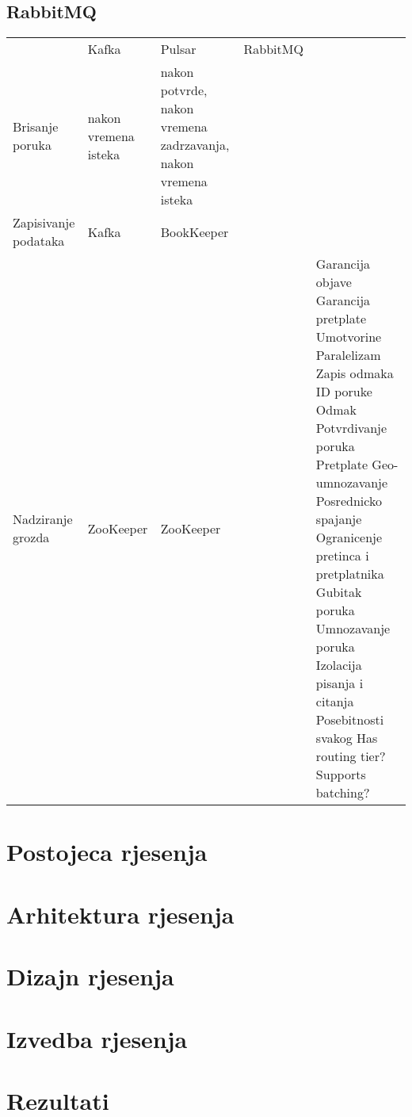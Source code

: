 \documentclass[times, utf8, diplomski, numeric]{fer}
\begin{document}
\section{RabbitMQ}



\begin{table}[]
\begin{tabular}{lllll}
                     & Kafka                & Pulsar                                                         & RabbitMQ &  \\
Brisanje poruka      & nakon vremena isteka & nakon potvrde, nakon vremena zadrzavanja, nakon vremena isteka &          &  \\
Zapisivanje podataka & Kafka                & BookKeeper                                                     &          &  \\
Nadziranje grozda    & ZooKeeper            & ZooKeeper                                                      &          & 
Garancija objave
Garancija pretplate
Umotvorine
Paralelizam
Zapis odmaka
ID poruke
Odmak
Potvrdivanje poruka
Pretplate
Geo-umnozavanje
Posrednicko spajanje
Ogranicenje pretinca i pretplatnika
Gubitak poruka
Umnozavanje poruka
Izolacija pisanja i citanja
Posebitnosti svakog
Has routing tier?
Supports batching?
\end{tabular}
\end{table}



\chapter{Postojeca rjesenja}

\chapter{Arhitektura rjesenja}

\chapter{Dizajn rjesenja}

\chapter{Izvedba rjesenja}

\chapter{Rezultati}
\end{document}
